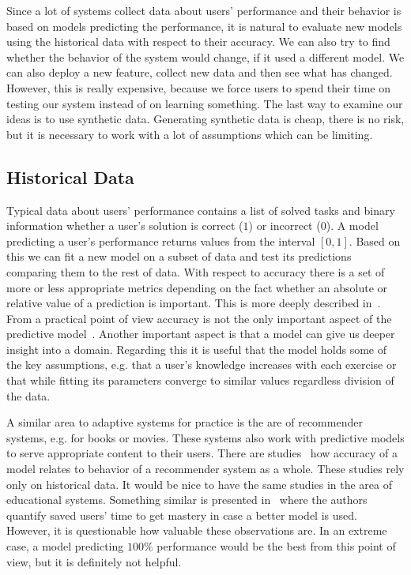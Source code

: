 \documentclass[table,color,cover,twoside,nolot,nolof]{fithesis3/fithesis3}
\begin{document}
Since a lot of systems collect data about users' performance and their
behavior is based on models predicting the performance, it is natural to
evaluate new models using the historical data with respect to their accuracy.
We can also try to find whether the behavior of the system would change, if it
used a different model. We can also deploy a new feature, collect new data and then
see what has changed. However, this is really expensive, because we
force users to spend their time on testing our system instead of on learning
something. The last way to examine our ideas is to use synthetic data.
Generating synthetic data is cheap, there is no risk, but it is necessary to
work with a lot of assumptions which can be limiting.

\subsection{Historical Data}

Typical data about users' performance contains a list of solved tasks and
binary information whether a user's solution is correct ($1$) or incorrect
($0$). A model predicting a user's performance returns values from the interval
$[0, 1]$. Based on this we can fit a new model on a subset of data and test its
predictions comparing them to the rest of data. With respect to accuracy there
is a set of more or less appropriate metrics depending on the fact whether an
absolute or relative value of a prediction is important. This is more deeply
described in~\cite{pelanek2014brief}. From a practical point of view
accuracy is not the only important aspect of the predictive
model~\cite{huang2015framework}. Another important aspect is that a model can
give us deeper insight into a domain. Regarding this it is useful that the
model holds some of the key assumptions, e.g. that a user's knowledge increases with
each exercise or that while fitting its parameters converge to similar values
regardless division of the data.

A similar area to adaptive systems for practice is the are of recommender
systems, e.g. for books or movies. These systems also work with predictive
models to serve appropriate content to their users. There are
studies~\cite{cremonesi2010performance} how accuracy of a model relates to
behavior of a recommender system as a whole. These studies rely only on
historical data. It would be nice to have the same studies in the area of
educational systems. Something similar is presented
in~\cite{yudelson2015small} where the authors quantify saved users' time to get
mastery in case a better model is used. However, it is questionable how valuable
these observations are. In an extreme case, a model predicting $100\%$
performance would be the best from this point of view, but it is definitely not
helpful.
\end{document}
